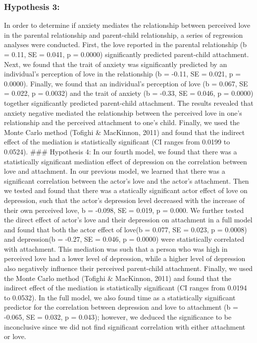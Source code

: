 \documentclass[man]{apa6}
\begin{document}
\hypertarget{hypothesis-3}{%
\subsubsection{Hypothesis 3:}\label{hypothesis-3}}

In order to determine if anxiety mediates the relationship between perceived love in the parental relationship and parent-child relationship, a series of regression analyses were conducted. First, the love reported in the parental relationship (b = 0.11, SE = 0.041, p = 0.0000) significantly predicted parent-child attachment. Next, we found that the trait of anxiety was significantly predicted by an individual's perception of love in the relationship (b = -0.11, SE = 0.021, p = 0.0000). Finally, we found that an individual's perception of love (b = 0.067, SE = 0.022, p = 0.0032) and the trait of anxiety (b = -0.33, SE = 0.046, p = 0.0000) together significantly predicted parent-child attachment. The results revealed that anxiety negative mediated the relationship between the perceived love in one's relationship and the perceived attachment to one's child. Finally, we used the Monte Carlo method (Tofighi \& MacKinnon, 2011) and found that the indirect effect of the mediation is statistically significant (CI ranges from 0.0199 to 0.0524).
\#\#\# Hypothesis 4:
In our fourth model, we found that there was a statistically significant mediation effect of depression on the correlation between love and attachment. In our previous model, we learned that there was a significant correlation between the actor's love and the actor's attachment. Then we tested and found that there was a statically significant actor effect of love on depression, such that the actor's depression level decreased with the increase of their own perceived love, b = -0.098, SE = 0.019, p = 0.000. We further tested the direct effect of actor's love and their depression on attachment in a full model and found that both the actor effect of love(b = 0.077, SE = 0.023, p = 0.0008) and depression(b = -0.27, SE = 0.046, p = 0.0000) were statistically correlated with attachment. This mediation was such that a person who was high in perceived love had a lower level of depression, while a higher level of depression also negatively influence their perceived parent-child attachment. Finally, we used the Monte Carlo method (Tofighi \& MacKinnon, 2011) and found that the indirect effect of the mediation is statistically significant (CI ranges from 0.0194 to 0.0532).
In the full model, we also found time as a statistically significant predictor for the correlation between depression and love to attachment (b = -0.065, SE = 0.032, p = 0.043); however, we deduced the significance to be inconclusive since we did not find significant correlation with either attachment or love.
\end{document}
